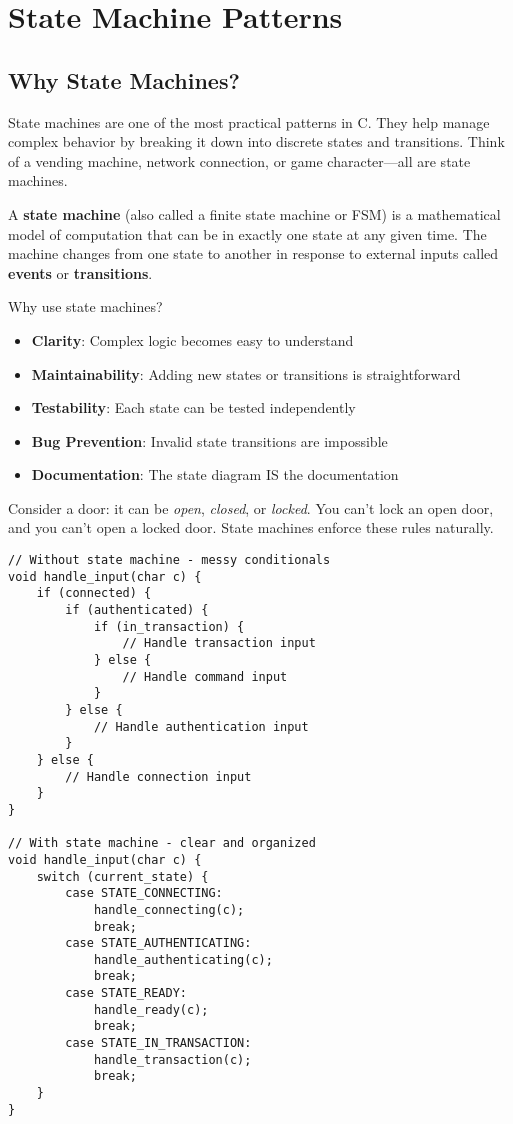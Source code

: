 \chapter{State Machine Patterns}

\section{Why State Machines?}

State machines are one of the most practical patterns in C. They help manage complex behavior by breaking it down into discrete states and transitions. Think of a vending machine, network connection, or game character---all are state machines.

A \textbf{state machine} (also called a finite state machine or FSM) is a mathematical model of computation that can be in exactly one state at any given time. The machine changes from one state to another in response to external inputs called \textbf{events} or \textbf{transitions}.

Why use state machines?

\begin{itemize}
    \item \textbf{Clarity}: Complex logic becomes easy to understand
    \item \textbf{Maintainability}: Adding new states or transitions is straightforward
    \item \textbf{Testability}: Each state can be tested independently
    \item \textbf{Bug Prevention}: Invalid state transitions are impossible
    \item \textbf{Documentation}: The state diagram IS the documentation
\end{itemize}

Consider a door: it can be \textit{open}, \textit{closed}, or \textit{locked}. You can't lock an open door, and you can't open a locked door. State machines enforce these rules naturally.

\begin{lstlisting}
// Without state machine - messy conditionals
void handle_input(char c) {
    if (connected) {
        if (authenticated) {
            if (in_transaction) {
                // Handle transaction input
            } else {
                // Handle command input
            }
        } else {
            // Handle authentication input
        }
    } else {
        // Handle connection input
    }
}

// With state machine - clear and organized
void handle_input(char c) {
    switch (current_state) {
        case STATE_CONNECTING:
            handle_connecting(c);
            break;
        case STATE_AUTHENTICATING:
            handle_authenticating(c);
            break;
        case STATE_READY:
            handle_ready(c);
            break;
        case STATE_IN_TRANSACTION:
            handle_transaction(c);
            break;
    }
}
\end{lstlisting}

